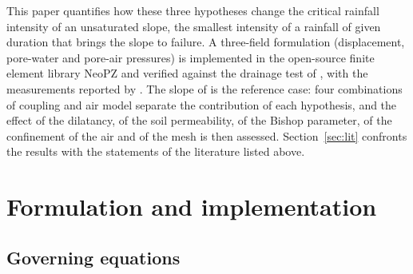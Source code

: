 \documentclass[preprint,12pt,authoryear]{elsarticle}
\begin{document}
This paper quantifies how these three hypotheses change the critical rainfall intensity of an unsaturated slope, the
smallest intensity of a rainfall of given duration that brings the slope to failure. A three-field formulation
(displacement, pore-water and pore-air pressures) is implemented in the open-source finite element library NeoPZ
\citep{devloo1997} and verified against the drainage test of \citet{liakopoulos1965}, with the measurements reported
by \citet{callari2009}. The slope of \citet{rahardjo2007} is the reference case: four combinations of coupling and
air model separate the contribution of each hypothesis, and the effect of the dilatancy, of the soil permeability, of
the Bishop parameter, of the confinement of the air and of the mesh is then assessed. Section~\ref{sec:lit} confronts
the results with the statements of the literature listed above.

\section{Formulation and implementation}\label{sec:form}

\subsection{Governing equations}
\end{document}
